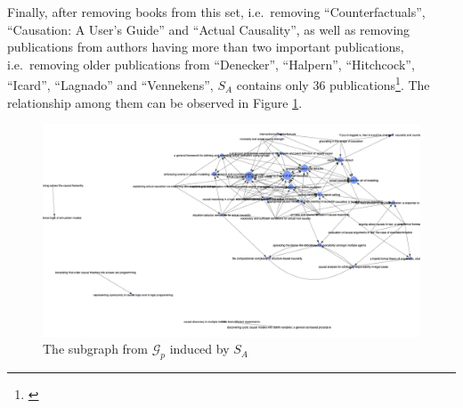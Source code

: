 \documentclass[11pt,a4paper]{book}
\theoremstyle{definition}
\theoremstyle{definition}
\theoremstyle{definition}
\theoremstyle{remark}
\newcommand{\prset}{S_{A}}
\newcommand{\pgraph}{\mathcal{G}_{p}}
\begin{document}
Finally, after removing books from this set, i.e.\ removing  ``Counterfactuals'',  ``Causation: A User's Guide'' and ``Actual Causality'', as well as removing publications from authors having more than two important publications, i.e.\ removing older publications from ``Denecker'', ``Halpern'', ``Hitchcock'', ``Icard'', ``Lagnado'' and ``Vennekens'',  $\prset$ contains only $36$ publications\footnote{\parencite{vennekens2010embracing,
bex2010hybrid,
lee2010representing,
lifschitz2010translating,
glymour2010actual,
claassen2010causal,
gerstenberg2010spreading,
halpern2011actual,
shulz2011if,
briggs2012interventionist,
baumgartner2013regularity,
hyttinen2013discovering,
halpern2015graded,
weslake2015partial,
chockler2015causal,
beckers2016general,
schaffer2016grounding,
halpern2016appropriate,
blanchard2017cause,
wright2017ness,
icard2017normality,
aleksandrowicz2017computational,
fenton2017proposed,
lagnado2017causation,
bochman2018actual,
ibeling2018conditional,
beckers2018principled,
bochman2018laws,
denecker2018causal,
batusov2018situation,
denecker2019explaining,
liepicna2019evaluation,
leblanc2019explaining,
liepicna2020arguing,
khannecessary,
ibeling2020probabilistic}}. The relationship among them can be observed in Figure \ref{fig:pgraph-important}.

\begin{figure}[h]
\includegraphics[width=\textwidth]{important_pgraph.png}
\caption{The subgraph from $\pgraph$ induced by $\prset$}
\label{fig:pgraph-important}
\end{figure}



%
\end{document}
